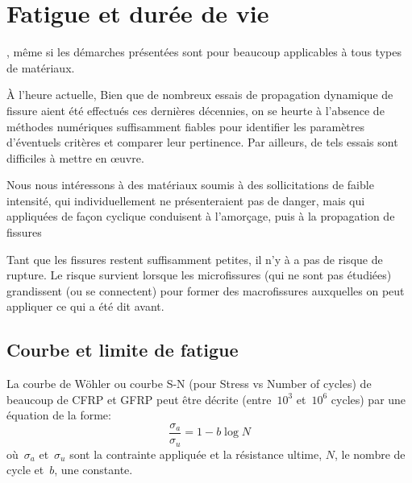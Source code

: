 \medskip
\section{Fatigue et durée de vie}

\medskip
{}, même si les démarches présentées sont pour beaucoup applicables à tous types
de matériaux.

\medskip
À l'heure actuelle,  Bien que de nombreux essais de propagation dynamique de fissure aient été effectués ces dernières décennies, on se heurte à l'absence de méthodes numériques suffisamment fiables pour identifier les paramètres d'éventuels critères et comparer leur pertinence. Par ailleurs, de tels essais sont difficiles à mettre en œuvre.

\medskip
Nous nous intéressons à des matériaux soumis à des sollicitations de faible intensité, qui individuellement ne présenteraient pas de danger, mais qui appliquées de façon cyclique conduisent à l'amorçage, puis à la propagation de fissures

Tant que les fissures restent suffisamment petites, il n'y à a pas de risque de rupture. Le risque survient lorsque les microfissures (qui ne sont pas étudiées) grandissent (ou se connectent) pour former des macrofissures auxquelles on peut appliquer ce qui a été dit avant.

\medskip
\subsection{Courbe et limite de fatigue}

La courbe de Wöhler ou courbe S-N (pour Stress vs Number of cycles) de beaucoup de CFRP et
GFRP  peut être décrite (entre~$10^3$ et~$10^6$ cycles) par une équation de la forme: \begin{equation}  \dfrac{\sigma_a}{\sigma_u}=1-b\log N \end{equation} 
où~$\sigma_a$ et~$\sigma_u$ sont la contrainte appliquée et la résistance ultime, $N$, le nombre de cycle et~$b$, une constante.

